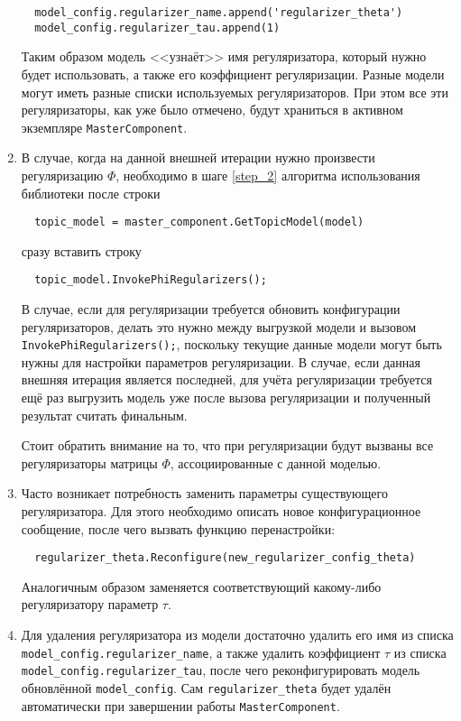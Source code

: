 \begin{enumerate}
	\vspace{4pt}	
	\verb|  model_config.regularizer_name.append('regularizer_theta')| \\
	\verb|  model_config.regularizer_tau.append(1)|
	\vspace{4pt}	
		
	Таким образом модель <<узнаёт>> имя регуляризатора, который нужно будет использовать, а также его коэффициент регуляризации. Разные модели могут иметь разные списки используемых регуляризаторов. При этом все эти регуляризаторы, как уже было отмечено, будут храниться в активном экземпляре \verb|MasterComponent|.
	
	\item В случае, когда на данной внешней итерации нужно произвести регуляризацию $\Phi$, необходимо в шаге \ref{step_2} алгоритма использования библиотеки после строки
	
	\vspace{4pt}	
	\verb|  topic_model = master_component.GetTopicModel(model)|
	\vspace{4pt}	
	
	сразу вставить строку 
	
	\vspace{4pt}	
	\verb|  topic_model.InvokePhiRegularizers();|
	\vspace{4pt}		
	
	В случае, если для регуляризации требуется обновить конфигурации регуляризаторов, делать это нужно между выгрузкой модели и вызовом \verb|InvokePhiRegularizers();|, поскольку текущие данные модели могут быть нужны для настройки параметров регуляризации. В случае, если данная внешняя итерация является последней, для учёта регуляризации требуется ещё раз выгрузить модель уже после вызова регуляризации и полученный результат считать финальным.
	
	Стоит обратить внимание на то, что при регуляризации будут вызваны все регуляризаторы матрицы $\Phi$, ассоциированные с данной моделью.
	
	\item Часто возникает потребность заменить параметры существующего регуляризатора. Для этого необходимо описать новое конфигурационное сообщение, после чего вызвать функцию перенастройки:
	
	\vspace{4pt}	
	\verb|  regularizer_theta.Reconfigure(new_regularizer_config_theta)|
	\vspace{4pt}
	
	Аналогичным образом заменяется соответствующий какому-либо регуляризатору параметр $\tau$.
	
	\item Для удаления регуляризатора из модели достаточно удалить его имя из списка \verb|model_config.regularizer_name|, а также удалить коэффициент $\tau$ из списка \verb|model_config.regularizer_tau|, после чего реконфигурировать модель обновлённой \verb|model_config|. Сам \verb|regularizer_theta| будет удалён автоматически при завершении работы \verb|MasterComponent|.
	
\end{enumerate}

